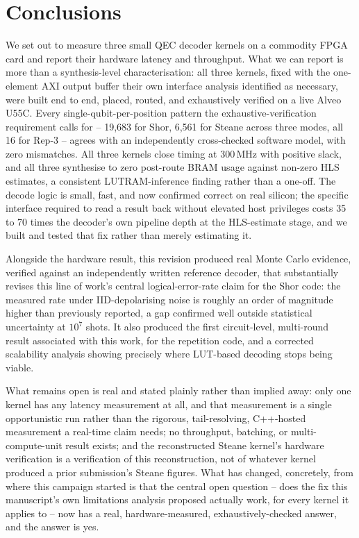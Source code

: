 \section{Conclusions}\label{sec:conclusions}

We set out to measure three small QEC decoder kernels on a commodity FPGA card and report their hardware latency and throughput. What we can report is more than a synthesis-level characterisation: all three kernels, fixed with the one-element AXI output buffer their own interface analysis identified as necessary, were built end to end, placed, routed, and exhaustively verified on a live Alveo U55C. Every single-qubit-per-position pattern the exhaustive-verification requirement calls for -- 19,683 for Shor, 6,561 for Steane across three modes, all 16 for Rep-3 -- agrees with an independently cross-checked software model, with zero mismatches. All three kernels close timing at 300\,MHz with positive slack, and all three synthesise to zero post-route BRAM usage against non-zero HLS estimates, a consistent LUTRAM-inference finding rather than a one-off. The decode logic is small, fast, and now confirmed correct on real silicon; the specific interface required to read a result back without elevated host privileges costs 35 to 70 times the decoder's own pipeline depth at the HLS-estimate stage, and we built and tested that fix rather than merely estimating it.

Alongside the hardware result, this revision produced real Monte Carlo evidence, verified against an independently written reference decoder, that substantially revises this line of work's central logical-error-rate claim for the Shor code: the measured rate under IID-depolarising noise is roughly an order of magnitude higher than previously reported, a gap confirmed well outside statistical uncertainty at \(10^7\) shots. It also produced the first circuit-level, multi-round result associated with this work, for the repetition code, and a corrected scalability analysis showing precisely where LUT-based decoding stops being viable.

What remains open is real and stated plainly rather than implied away: only one kernel has any latency measurement at all, and that measurement is a single opportunistic run rather than the rigorous, tail-resolving, C++-hosted measurement a real-time claim needs; no throughput, batching, or multi-compute-unit result exists; and the reconstructed Steane kernel's hardware verification is a verification of this reconstruction, not of whatever kernel produced a prior submission's Steane figures. What has changed, concretely, from where this campaign started is that the central open question -- does the fix this manuscript's own limitations analysis proposed actually work, for every kernel it applies to -- now has a real, hardware-measured, exhaustively-checked answer, and the answer is yes.
